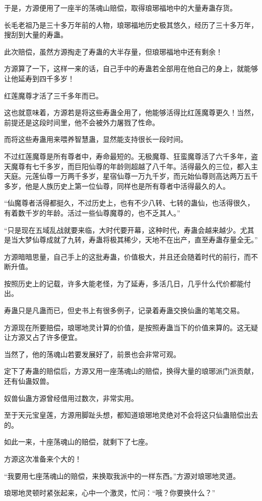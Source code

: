\begin{this_body}
于是，方源便用了一座半的荡魂山赔偿，取得琅琊福地中的大量寿蛊存货。

长毛老祖乃是三十多万年前的人物，琅琊福地历史极其悠久，经历了三十多万年，搜刮到大量的寿蛊。

此次赔偿，虽然方源掏走了寿蛊的大半存量，但琅琊福地中还有剩余！

方源算了一下，这样一来的话，自己手中的寿蛊若全部用在他自己的身上，就能够让他延寿到四千多岁！

红莲魔尊才活了三千多年而已。

这也就意味着，方源若是将这些寿蛊全用了，他能够活得比红莲魔尊更久！当然，前提还是这段时间里，他不会被外力屠戮了性命。

而将这些寿蛊用来喂养智慧蛊，显然能支持很长一段时间。

不过红莲魔尊是所有尊者中，寿命最短的。无极魔尊、狂蛮魔尊活了六千多年，盗天魔尊有七千多岁，而巨阳仙尊的年龄则超越了八千年。活得最久的三位，都入主天庭。元莲仙尊一万两千多岁，星宿仙尊一万九千岁，而元始仙尊则高达两万五千多岁，他是人族历史上第一位仙尊，同样也是所有尊者中活得最久的人。

“仙魔尊者活得都挺久，不过历史上，也有不少八转、七转的蛊仙，也活得很久，有着数千岁的年龄。活过一些仙尊魔尊的，也不乏其人。”

“只是现在五域乱战就要来临，大时代要开幕，这种时代，寿蛊会越来越少。尤其是当大梦仙尊成就了九转，寿蛊将极其稀少，天地不在出产，直至寿蛊存量全无。”

方源暗暗思量，自己手上的这批寿蛊，价值极大，并且还会随着时代的前行，而不断升值。

按照历史上的记载，许多大能老怪，为了延寿，多活几日，几乎什么代价都能付出。

寿蛊只是凡蛊而已，但史书上有很多例子，记录着寿蛊交换仙蛊的笔笔交易。

方源现在所要赔偿，琅琊地灵计算的价值，是按照寿蛊当下的价值来算的。这无疑让方源又占了许多便宜。

当然了，他的荡魂山若要发展好了，前景也会非常可观。

定下了寿蛊的赔偿后，方源又用一座荡魂山的赔偿，换得大量的琅琊派门派贡献，还有仙蛊奴兽。

奴兽仙蛊方源曾经借用过数次，非常实用。

至于天元宝皇莲，方源用脚趾头想，都知道琅琊地灵绝对不会将这只仙蛊赔偿出去的。

如此一来，十座荡魂山的赔偿，就剩下了七座。

方源这次准备来个大的！

“我要用七座荡魂山的赔偿，来换取我派中的一样东西。”方源对琅琊地灵道。

琅琊地灵顿时紧张起来，心中一个激灵，忙问：“哦？你要换什么？”

\end{this_body}

